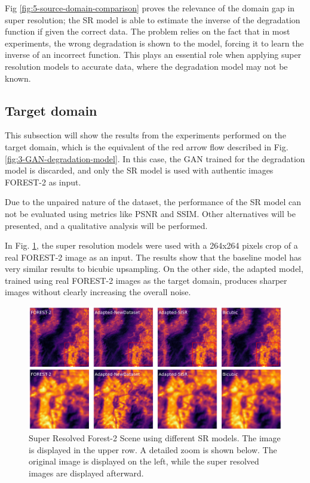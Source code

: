         Fig \ref{fig:5-source-domain-comparison} proves the relevance of the domain gap in super resolution; the SR model is able to estimate the inverse of the degradation function if given the correct data.
        The problem relies on the fact that in most experiments, the wrong degradation is shown to the model, forcing it to learn the inverse of an incorrect function.  
        This plays an essential role when applying super resolution models to accurate data, where the degradation model may not be known. 

    \subsection{Target domain}

        This subsection will show the results from the experiments performed on the target domain, which is the equivalent of the red arrow flow described in Fig. \ref{fig:3-GAN-degradation-model}.
        In this case, the GAN trained for the degradation model is discarded, and only the SR model is used with authentic images FOREST-2 as input.
        
        Due to the unpaired nature of the dataset, the performance of the SR model can not be evaluated using metrics like PSNR and SSIM. 
        Other alternatives will be presented, and a qualitative analysis will be performed. 
        


        In Fig. \ref{fig:5-target_prediction_sample}, the super resolution models were used with a 264x264 pixels crop of a real FOREST-2 image as an input.
        The results show that the baseline model has very similar results to bicubic upsampling.
        On the other side, the adapted model, trained using real FOREST-2 images as the target domain, produces sharper images without clearly increasing the overall noise.
        
        


        \begin{figure}[H]
            \centering
            \includegraphics[scale=0.28]{Includes/5-target_prediction_sample.pdf}
            \caption{Super Resolved Forest-2 Scene using different SR models.
                     The image is displayed in the upper row. A detailed zoom is shown below. The original image is displayed on the left, while the super resolved images are displayed afterward.
                    }
            \label{fig:5-target_prediction_sample}
        \end{figure}


